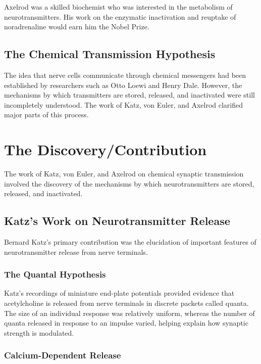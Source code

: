 Axelrod was a skilled biochemist who was interested in the metabolism of neurotransmitters. His work on the enzymatic inactivation and reuptake of noradrenaline would earn him the Nobel Prize.

\subsection{The Chemical Transmission Hypothesis}

The idea that nerve cells communicate through chemical messengers had been established by researchers such as Otto Loewi and Henry Dale. However, the mechanisms by which transmitters are stored, released, and inactivated were still incompletely understood. The work of Katz, von Euler, and Axelrod clarified major parts of this process.

\section{The Discovery/Contribution}

The work of Katz, von Euler, and Axelrod on chemical synaptic transmission involved the discovery of the mechanisms by which neurotransmitters are stored, released, and inactivated.

\subsection{Katz's Work on Neurotransmitter Release}

Bernard Katz's primary contribution was the elucidation of important features of neurotransmitter release from nerve terminals.

\subsubsection{The Quantal Hypothesis}

Katz's recordings of miniature end-plate potentials provided evidence that acetylcholine is released from nerve terminals in discrete packets called quanta. The size of an individual response was relatively uniform, whereas the number of quanta released in response to an impulse varied, helping explain how synaptic strength is modulated.

\subsubsection{Calcium-Dependent Release}

